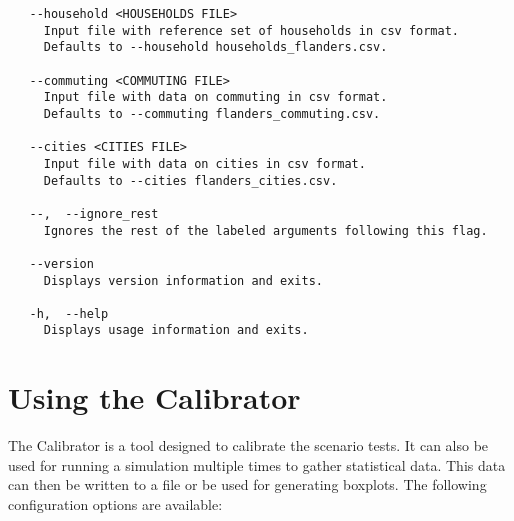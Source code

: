 \begin{verbatim}
   --household <HOUSEHOLDS FILE>
     Input file with reference set of households in csv format.            
     Defaults to --household households_flanders.csv.
 
   --commuting <COMMUTING FILE>
     Input file with data on commuting in csv format.                      
     Defaults to --commuting flanders_commuting.csv.
 
   --cities <CITIES FILE>
     Input file with data on cities in csv format.                         
     Defaults to --cities flanders_cities.csv.
 
   --,  --ignore_rest
     Ignores the rest of the labeled arguments following this flag.
 
   --version
     Displays version information and exits.
 
   -h,  --help
     Displays usage information and exits.
\end{verbatim}

\section{Using the Calibrator}
\label{sec:calibrator}

The Calibrator is a tool designed to calibrate the scenario tests.
It can also be used for running a simulation multiple times to gather statistical data.
This data can then be written to a file or be used for generating boxplots.
The following configuration options are available:


